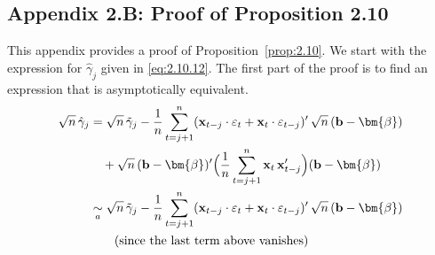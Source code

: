 \subsection*{Appendix 2.B: Proof of Proposition 2.10}

This appendix provides a proof of Proposition~\ref{prop:2.10}. We start with the expression
for $\hat{\gamma}_j$ given in \eqref{eq:2.10.12}. The first part of the proof is to find an expression that is
asymptotically equivalent.
%
\begin{align*}
\sqrt{n}\,\hat{\gamma}_j
&= \sqrt{n}\,\tilde{\gamma}_j
- \frac{1}{n}\sum_{t=j+1}^{n}
(\mathbf{x}_{t-j}\cdot\varepsilon_t + \mathbf{x}_t\cdot\varepsilon_{t-j})'\,
\sqrt{n}\,(\mathbf{b} - \bm{\beta}) \\
&\quad + \sqrt{n}\,(\mathbf{b} - \bm{\beta})'\Bigl(\frac{1}{n}\sum_{t=j+1}^{n}
\mathbf{x}_t\,\mathbf{x}_{t-j}'\Bigr)(\mathbf{b} - \bm{\beta}) \\
&\underset{a}{\sim}
\sqrt{n}\,\tilde{\gamma}_j
- \frac{1}{n}\sum_{t=j+1}^{n}
(\mathbf{x}_{t-j}\cdot\varepsilon_t + \mathbf{x}_t\cdot\varepsilon_{t-j})'\,
\sqrt{n}\,(\mathbf{b} - \bm{\beta}) \\
&\qquad \text{(since the last term above vanishes)}
\end{align*}
%
